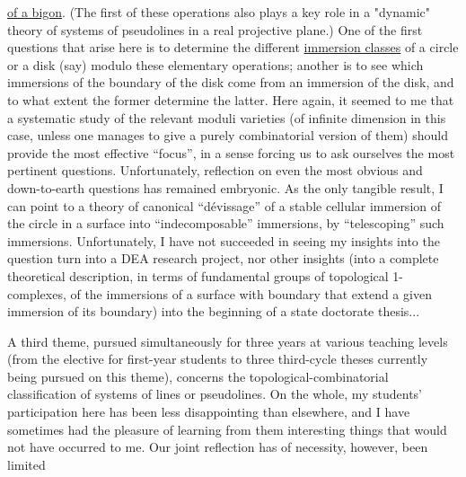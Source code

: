 
\uline{of a bigon}. (The first of these operations also plays a
key role in a "dynamic" theory of systems of pseudolines
in a real projective plane.) One of the first questions
that arise here is to determine the different \uline{immersion
classes} of a circle or a disk (say) modulo these elementary
operations; another is to see which immersions
of the boundary of the disk come from an immersion of the
disk, and to what extent the former determine the latter.
Here again, it seemed to me that a systematic study
of the relevant moduli varieties (of infinite dimension in this
case, unless one manages to give a purely combinatorial
version of them) should provide the most effective ``focus'',
in a sense forcing us to ask ourselves the most pertinent
questions. Unfortunately, reflection on even the
most obvious and down-to-earth questions has remained embryonic.
As the only tangible result, I can point to a
theory of canonical ``dévissage'' of a stable cellular immersion
of the circle in a surface into ``indecomposable'' immersions,
by ``telescoping'' such immersions. Unfortunately, I have not
succeeded in seeing my insights into the question turn into
a DEA research project, nor other insights (into a complete
theoretical description, in terms of fundamental groups of
topological 1-complexes, of the immersions of a surface with boundary
that extend a given immersion of its boundary) into the beginning of a
state doctorate thesis...

A third theme, pursued simultaneously for three
years at various teaching levels (from the elective for
first-year students to three third-cycle theses currently
being pursued on this theme), concerns the topological-combinatorial
classification of systems of lines or pseudolines.
On the whole, my students' participation here has been less
disappointing than elsewhere, and I have sometimes had the pleasure of learning
from them interesting things that would not have occurred to me.
Our joint reflection has of necessity, however, been limited


